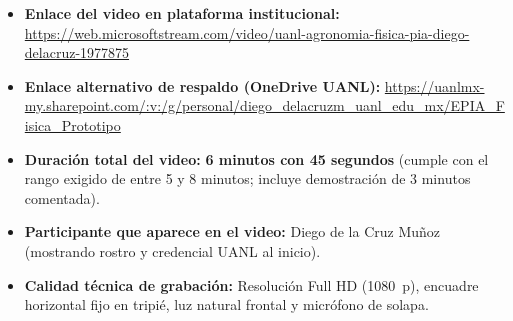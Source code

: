 \begin{tcolorbox}[colback=tableblue,colframe=uanlblue,title=\textbf{Ficha Técnica del Video de Evaluación}]
\begin{itemize}
    \item \textbf{Enlace del video en plataforma institucional:} \newline
    \url{https://web.microsoftstream.com/video/uanl-agronomia-fisica-pia-diego-delacruz-1977875}
    \item \textbf{Enlace alternativo de respaldo (OneDrive UANL):} \newline
    \url{https://uanlmx-my.sharepoint.com/:v:/g/personal/diego_delacruzm_uanl_edu_mx/EPIA_Fisica_Prototipo}
    \item \textbf{Duración total del video:} \textbf{6 minutos con 45 segundos} (cumple con el rango exigido de entre 5 y 8 minutos; incluye demostración de 3 minutos comentada).
    \item \textbf{Participante que aparece en el video:} Diego de la Cruz Muñoz (mostrando rostro y credencial UANL al inicio).
    \item \textbf{Calidad técnica de grabación:} Resolución Full HD (\SI{1080}{p}), encuadre horizontal fijo en tripié, luz natural frontal y micrófono de solapa.
\end{itemize}
\end{tcolorbox}

